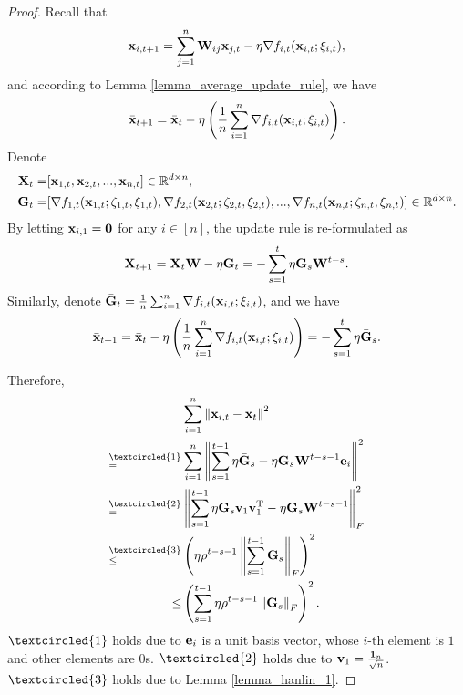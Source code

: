 \documentclass{article}
\begin{document}
\begin{proof}


Recall that 
\begin{align}
\nonumber
{\bf x}_{i,t+1} = \sum_{j=1}^n {\bf W}_{ij}{\bf x}_{j,t} - \eta \nabla f_{i,t}({\bf x}_{i,t};\xi_{i,t}), 
\end{align} and according to Lemma \ref{lemma_average_update_rule}, we have 
\begin{align}
\nonumber
\bar{{\bf x}}_{t+1} = \bar{{\bf x}}_t - \eta \left( \frac{1}{n}\sum_{i=1}^n \nabla f_{i,t}({\bf x}_{i,t};\xi_{i,t}) \right).
\end{align} Denote 
\begin{align}
\nonumber
{\bf X}_t = &  [{\bf x}_{1,t}, {\bf x}_{2,t}, ..., {\bf x}_{n,t}] \in \mathbb{R}^{d\times n}, \\ \nonumber
{\bf G}_t = & [\nabla f_{1,t}({\bf x}_{1,t};\zeta_{1,t},\xi_{1,t}), \nabla f_{2,t}({\bf x}_{2,t};\zeta_{2,t},\xi_{2,t}), ..., \nabla f_{n,t}({\bf x}_{n,t};\zeta_{n,t},\xi_{n,t})] \in \mathbb{R}^{d\times n}.
\end{align} By letting ${\bf x}_{i,1} = {\bf 0}$ for any $i\in[n]$, the update rule is re-formulated as 
\begin{align}
\nonumber
{\bf X}_{t+1} = {\bf X}_t {\bf W} - \eta {\bf G}_t = - \sum_{s=1}^t \eta {\bf G}_s {\bf W}^{t-s}. 
\end{align} Similarly, denote $\bar{{\bf G}}_t = \frac{1}{n}\sum_{i=1}^n \nabla f_{i,t}({\bf x}_{i,t};\xi_{i,t})$, and we have
\begin{align}
\bar{{\bf x}}_{t+1} = \bar{{\bf x}}_t - \eta \left( \frac{1}{n}\sum_{i=1}^n \nabla f_{i,t}({\bf x}_{i,t};\xi_{i,t}) \right) = - \sum_{s=1}^t \eta \bar{{\bf G}}_s. 
\end{align}


Therefore, 
\begin{align}
\nonumber
& \sum_{i=1}^n \lrnorm{\x_{i,t} - \bar{\x}_t}^2 \\ \nonumber
\refabovecir{=}{\textcircled{1}} & \sum_{i=1}^n \lrnorm{ \sum_{s=1}^{t-1} \eta \bar{\G}_s - \eta \G_s \W^{t-s-1}\e_i }^2   \\ \nonumber
\refabovecir{=}{\textcircled{2}} & \lrnorm{ \sum_{s=1}^{t-1} \eta \G_s\v_1 \v_1\Tr - \eta \G_s \W^{t-s-1} }^2_F   \\ \nonumber
\refabovecir{\le}{\textcircled{3}} & \lrincir{ \eta \rho^{t-s-1} \lrnorm{\sum_{s=1}^{t-1}\G_s}_F}^2 \\ \nonumber
\le & \lrincir{ \sum_{s=1}^{t-1} \eta \rho^{t-s-1} \lrnorm{\G_s}_F}^2.
\end{align} $\textcircled{1}$ holds due to ${\bf e}_i$ is a unit basis vector, whose $i$-th element is $1$ and other elements are $0$s. $\textcircled{2}$ holds due to ${\bf v}_1 = \frac{{\bf 1}_n}{\sqrt{n}}$. $\textcircled{3}$ holds due to Lemma \ref{lemma_hanlin_1}. 



\end{proof}
\end{document}
